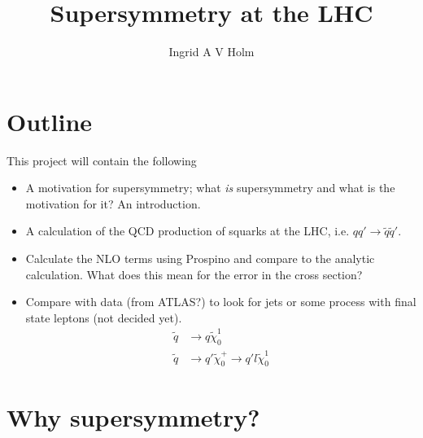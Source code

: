 \documentclass[11pt]{article}
\begin{document}
\title{Supersymmetry at the LHC}
\author{Ingrid A V Holm}
\maketitle

\pagebreak


\section*{Outline}
\begin{flushleft}
This project will contain the following
\begin{itemize}
\item A motivation for supersymmetry; what \textit{is} supersymmetry and what is the motivation for it? An introduction.
\item A calculation of the QCD production of squarks at the LHC, i.e. $qq' \rightarrow \tilde{q} \tilde{q}'$.
\item Calculate the NLO terms using Prospino \cite{beenakker1996prospino} and compare to the analytic calculation. What does this mean for the error in the cross section?
\item Compare with data (from ATLAS?) to look for jets or some process with final state leptons (not decided yet). 
\begin{align*}
\tilde{q} &\rightarrow q \tilde{\chi}_0^1\\
\tilde{q} &\rightarrow q' \tilde{\chi}_0^+ \rightarrow q' l \tilde{\chi}_0^1
\end{align*}
\end{itemize}
\end{flushleft}




\section{Why supersymmetry?}
\end{document}
